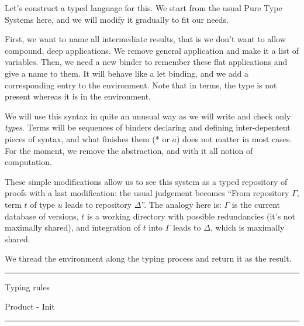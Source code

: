 \documentclass[ignorenonframetext,red]{beamer}
\begin{document}
Let's construct a typed language for this. We start from the usual
Pure Type Systems here, and we will modify it gradually to fit our
needs.

First, we want to name all intermediate results, that is we don't want
to allow compound, deep applications. We remove general application
and make it a list of variables. Then, we need a new binder to
remember these flat applications and give a name to them. It will
behave like a \textsf{let} binding, and we add a corresponding entry
to the environment. Note that in terms, the type is not present
whereas it is in the environment.

We will use this syntax in quite an unusual way as we will write and
check only \emph{types}. Terms will be sequences of binders declaring
and defining inter-depentent pieces of syntax, and what finishes them
(* or $a$) does not matter in most cases. For the moment, we remove
the abstraction, and with it all notion of computation.

These simple modifications allow us to see this system as a typed
repository of proofs with a last modification: the usual judgement
becomes ``From repository $\Gamma$, term $t$ of type $u$ leads to
repository $\Delta$''. The analogy here is: $\Gamma$ is the current
database of versions, $t$ is a working directory with possible
redundancies (it's not maximally shared), and integration of $t$ into
$\Gamma$ leads to $\Delta$, which is maximally shared.

We thread the environment along the typing process and return it as
the result.

\newcommand\g[1]{\textcolor{gray}{#1}}

\hrule
\begin{frame}{Typing rules}
  \begin{block}{Product - Init}
  \end{block}
\end{frame}
\hrule
\end{document}
